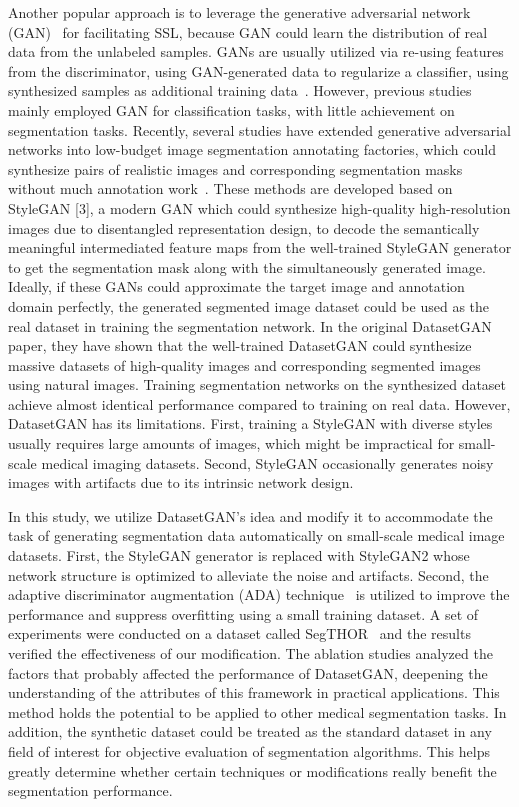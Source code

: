\documentclass[conference]{IEEEtran}
\begin{document}
Another popular approach is to leverage the generative adversarial network (GAN)~\cite{Goodfellow2014GenerativeAN} for facilitating SSL, because GAN could learn the distribution of real data from the unlabeled samples. GANs are usually utilized via re-using features from the discriminator, using GAN-generated data to regularize a classifier, using synthesized samples as additional training data~\cite{Yang2021ASO}. However, previous studies mainly employed GAN for classification tasks, with little achievement on segmentation tasks.
Recently, several studies have extended generative adversarial networks into low-budget image segmentation annotating factories, which could synthesize pairs of realistic images and corresponding segmentation masks without much annotation work~\cite{Zhang2021DatasetGANEL,Li2021SemanticSW}. 
These methods are developed based on StyleGAN [3], a modern GAN which could synthesize high-quality high-resolution images due to disentangled representation design, to decode the semantically meaningful intermediated feature maps from the well-trained StyleGAN generator to get the segmentation mask along with the simultaneously generated image. 
Ideally, if these GANs could approximate the target image and annotation domain perfectly, the generated segmented image dataset could be used as the real dataset in training the segmentation network. 
In the original DatasetGAN paper,
they have shown that the well-trained DatasetGAN could synthesize massive datasets of high-quality images and corresponding segmented images using natural images.
Training segmentation networks on the synthesized dataset achieve almost identical performance compared to training on real data. 
However, DatasetGAN has its limitations. First, training a StyleGAN with diverse styles usually requires large amounts of images, which might be impractical for small-scale medical imaging datasets. 
Second, StyleGAN occasionally generates noisy images with artifacts due to its intrinsic network design. 

In this study, we utilize DatasetGAN's idea and modify it to accommodate the task of generating segmentation data automatically on small-scale medical image datasets. 
First, the StyleGAN generator is replaced with StyleGAN2 whose network structure is optimized to alleviate the noise and artifacts. 
Second, the adaptive discriminator augmentation (ADA) technique~\cite{karras2020training} is utilized to improve the performance and suppress overfitting using a small training dataset.  
A set of experiments were conducted on a dataset called SegTHOR~\cite{Lambert2020SegTHORSO} and the results verified the effectiveness of our modification. 
The ablation studies analyzed the factors that probably affected the performance of DatasetGAN, deepening the understanding of the attributes of this framework in practical applications. 
This method holds the potential to be applied to other medical segmentation tasks. 
In addition, the synthetic dataset could be treated as the standard dataset in any field of interest for objective evaluation of segmentation algorithms. 
This helps greatly determine whether certain techniques or modifications really benefit the segmentation performance. 
\end{document}
